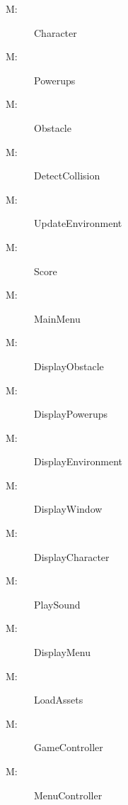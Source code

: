 \documentclass[12pt, titlepage]{article}
\newcounter{mnum}
\newcommand{\mthemnum}{M\themnum}
\begin{document}
\begin{description}
    \item [ \mthemnum \label{m1}:] Character
    \item [ \mthemnum \label{m2}:] Powerups
    \item [ \mthemnum \label{m3}:] Obstacle
    \item [ \mthemnum \label{m4}:] DetectCollision
    \item [ \mthemnum \label{m5}:] UpdateEnvironment
    \item [ \mthemnum \label{m6}:] Score
    \item [ \mthemnum \label{m7}:] MainMenu
    \item [ \mthemnum \label{m8}:] DisplayObstacle
    \item [ \mthemnum \label{m9}:] DisplayPowerups
    \item [ \mthemnum \label{m10}:] DisplayEnvironment
    \item [ \mthemnum \label{m11}:] DisplayWindow
    \item [ \mthemnum \label{m12}:] DisplayCharacter
    \item [ \mthemnum \label{m13}:] PlaySound
    \item [ \mthemnum \label{m14}:] DisplayMenu
    \item [ \mthemnum \label{m15}:] LoadAssets
    \item [ \mthemnum \label{m16}:] GameController
    \item [ \mthemnum \label{m17}:] MenuController

\end{description}
\end{document}
